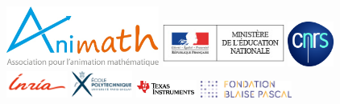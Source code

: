\begin{figure}[h!]
	
	\vspace{1cm}
	
	\centering
  \begin{minipage}[c]{4cm}
     \centering
	   \includegraphics[width=5cm]{01-Intro/logos/animath.jpg}
   \end{minipage}

   \vspace{2cm}

   \begin{minipage}[c]{4cm}
   \centering
        \includegraphics[width=4cm]{01-Intro/logos/education_nationale.jpg}
   \end{minipage} \hfill
   \begin{minipage}[c]{2cm}
   \centering
      \includegraphics[width=1.5cm]{01-Intro/logos/cnrs.jpg}
   \end{minipage} \hfill \hskip 1cm
   \begin{minipage}[c]{2cm}
   \centering
      \includegraphics[width=2cm]{01-Intro/logos/inria.png}
   \end{minipage}

   \bigskip

   \begin{minipage}[c]{2cm}
   \centering
   \includegraphics[width=2cm]{01-Intro/logos/polytechnique.jpg}
   \end{minipage} \hskip 2cm \hfill
      \begin{minipage}[c]{2cm}
   \centering
        \includegraphics[width=2cm]{01-Intro/logos/texas.jpg}
   \end{minipage} \hfill
   \begin{minipage}[c]{3cm}
   \centering
      \includegraphics[width=3cm]{01-Intro/logos/fondation_blaise_pascal.jpg}
   \end{minipage}


\end{figure}

